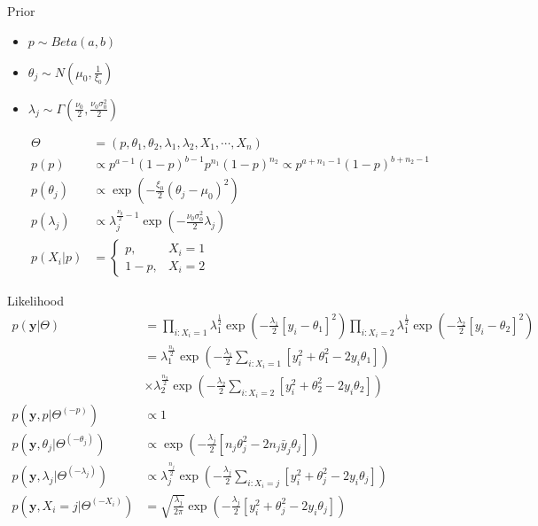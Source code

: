     Prior
    \begin{itemize}
        \item $p\sim Beta(a, b)$
        \item $\theta_j \sim N(\mu_0, \frac{1}{\xi_0})$
        \item $\lambda_j \sim \Gamma\left(\frac{\nu_0}{2},
            \frac{\nu_0\sigma_0^2}{2}\right)$
    \end{itemize}
    \begin{align*}
        \Theta &= (p, \theta_1, \theta_2, \lambda_1,
        \lambda_2, X_1, \cdots, X_n)\\
        p(p) &\propto p^{a-1} (1-p)^{b-1} p^{n_1}
        (1-p)^{n_2}
             \propto p^{a+n_1-1} (1-p)^{b+n_2 - 1}\\
        p(\theta_j) &\propto
        \exp(-\frac{\xi_0}{2}(\theta_j - \mu_0)^2)\\
        p(\lambda_j) &\propto \lambda_j^{\frac{\nu_0}{2}-1}
        \exp\left(
            -\frac{\nu_0\sigma_0^2}{2}\lambda_j
        \right)\\
        p(X_i|p) &= \begin{cases}
            p, & X_i = 1\\
            1-p, & X_i = 2
        \end{cases}
    \end{align*}

    Likelihood
    \begin{align*}
        p(\mathbf{y}|\Theta)
        &= \prod_{i:X_i = 1}\lambda_1^{\frac{1}{2}}
        \exp\left(
            -\frac{\lambda_1}{2}[y_i - \theta_1]^2
        \right)
        \prod_{i:X_i = 2}\lambda_1^{\frac{1}{2}}
        \exp\left(
            -\frac{\lambda_2}{2}[y_i - \theta_2]^2
        \right) \\
        &= \lambda_1^{\frac{n_1}{2}}
        \exp\left(
            -\frac{\lambda_1}{2}
            \sum_{i:X_i=1}[y_i^2 + \theta_1^2 - 2y_i\theta_1]
        \right)\\
        &\times \lambda_2^{\frac{n_2}{2}}
        \exp\left(
            -\frac{\lambda_2}{2}
            \sum_{i:X_i=2}[y_i^2 + \theta_2^2 - 2y_i\theta_2]
        \right)\\
        p(\mathbf{y}, p |\Theta^{(-p)})
            &\propto 1\\
        p(\mathbf{y}, \theta_j | \Theta^{(-\theta_j)})
            &\propto \exp\left(
                -\frac{\lambda_j}{2}[n_j\theta_j^2 -
                2n_j\bar{y}_j\theta_j]
            \right)\\
        p(\mathbf{y}, \lambda_j | \Theta^{(-\lambda_j)})
            &\propto \lambda_j^{\frac{n_j}{2}}
        \exp\left(
            -\frac{\lambda_j}{2}
            \sum_{i:X_i=j}[y_i^2 + \theta_j^2 - 2y_i\theta_j]
        \right)\\
        p(\mathbf{y}, X_i = j | \Theta^{(-X_i)})
            &= \sqrt{\frac{\lambda_j}{2\pi}}
        \exp\left(
            -\frac{\lambda_j}{2}
            [y_i^2 + \theta_j^2 - 2y_i\theta_j]
        \right)
    \end{align*}

